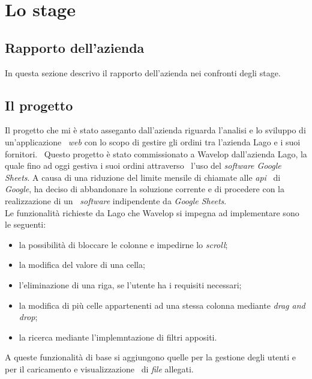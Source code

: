 
\chapter{Lo stage}
\label{cap:stage}
\section{Rapporto dell'azienda}
In questa sezione descrivo il rapporto dell'azienda nei confronti degli stage.

\section{Il progetto}
Il progetto che mi è stato asseganto dall'azienda riguarda l'analisi e lo sviluppo di un'applicazione \
\emph{web} con lo scopo di gestire gli ordini tra l'azienda Lago e i suoi fornitori. \ 
Questo progetto è stato commissionato a Wavelop dall'azienda Lago, la quale fino ad oggi gestiva i suoi ordini attraverso \
l'uso del \emph{software Google Sheets}. A causa di una riduzione del limite mensile di chiamate alle \emph{\acrshort{api}} \
di \emph{Google}, ha deciso di abbandonare la soluzione corrente e di procedere con la realizzazione di un \
\emph{software} indipendente da \emph{Google Sheets}. \\

Le funzionalità richieste da Lago che Wavelop si impegna ad implementare sono le seguenti:
\begin{itemize}
  \item la possibilità di bloccare le colonne e impedirne lo \emph{scroll};
  \item la modifica del valore di una cella;
  \item l'eliminazione di una riga, se l'utente ha i requisiti necessari;
  \item la modifica di più celle appartenenti ad una stessa colonna mediante \emph{drag and drop};
  \item la ricerca mediante l'implemntazione di filtri appositi.
\end{itemize}
A queste funzionalità di base si aggiungono quelle per la gestione degli utenti e per il caricamento e visualizzazione \
di \emph{file} allegati. 

